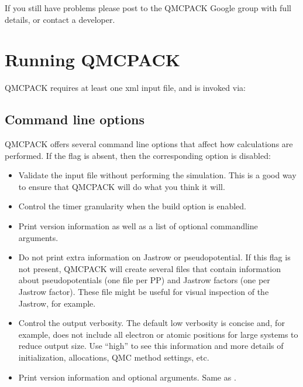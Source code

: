 \documentclass[letterpaper,10pt,english]{sphinxmanual}
\begin{document}
If you still have problems please post to the QMCPACK Google group with full
details, or contact a developer.


\chapter{Running QMCPACK}
\label{\detokenize{running:running-qmcpack}}\label{\detokenize{running:running}}\label{\detokenize{running::doc}}
QMCPACK requires at least one xml input file, and is invoked via:



\section{Command line options}
\label{\detokenize{running:command-line-options}}
QMCPACK offers several command line options that affect how calculations
are performed. If the flag is absent, then the corresponding
option is disabled:
\begin{itemize}
\item {} 
 Validate the input file without performing the simulation. This is a good way to ensure that QMCPACK will do what you think it will.

\item {} 
 Control the timer granularity when the build option  is enabled.

\item {} 
 Print version information as well as a list of optional
command\sphinxhyphen{}line arguments.

\item {} 
 Do not print extra information on Jastrow or pseudopotential.
If this flag is not present, QMCPACK will create several  files
that contain information about pseudopotentials (one file per PP) and Jastrow
factors (one per Jastrow factor). These file might be useful for visual inspection
of the Jastrow, for example.

\item {} 
 Control the output verbosity. The default low verbosity is concise and, for example, does not include all electron or atomic positions for large systems to reduce output size. Use “high” to see this information and more details of initialization, allocations, QMC method settings, etc.

\item {} 
 Print version information and optional arguments. Same as .

\end{itemize}
\end{document}
